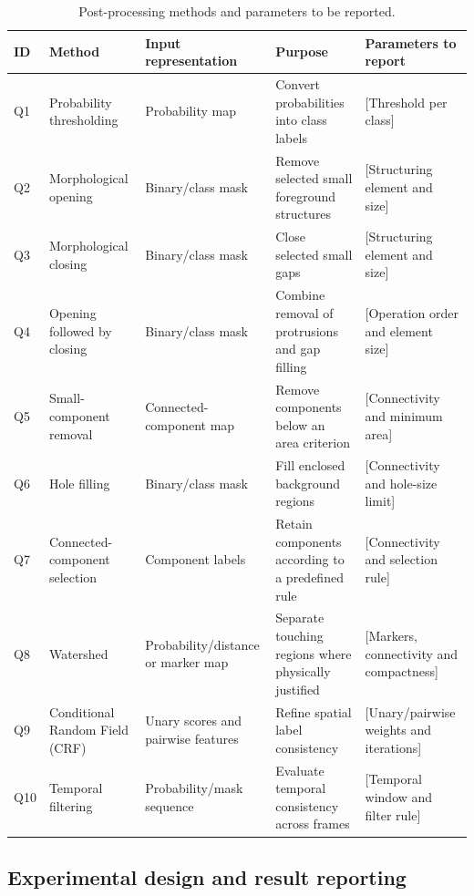 \documentclass[final,5p,times,twocolumn]{elsarticle}
\begin{document}
\begin{table}[t]
    \centering
    \caption{Post-processing methods and parameters to be reported.}
    \label{tab:postprocessing}
    \small
    \begin{tabularx}{\textwidth}{L{0.65cm} L{3.0cm} L{2.5cm} Y Y}
        \toprule
        \textbf{ID} & \textbf{Method} & \textbf{Input representation} &
        \textbf{Purpose} & \textbf{Parameters to report} \\
        \midrule
        Q1 & Probability thresholding & Probability map &
        Convert probabilities into class labels & [Threshold per class] \\
        Q2 & Morphological opening & Binary/class mask &
        Remove selected small foreground structures & [Structuring element and size] \\
        Q3 & Morphological closing & Binary/class mask &
        Close selected small gaps & [Structuring element and size] \\
        Q4 & Opening followed by closing & Binary/class mask &
        Combine removal of protrusions and gap filling & [Operation order and element size] \\
        Q5 & Small-component removal & Connected-component map &
        Remove components below an area criterion & [Connectivity and minimum area] \\
        Q6 & Hole filling & Binary/class mask &
        Fill enclosed background regions & [Connectivity and hole-size limit] \\
        Q7 & Connected-component selection & Component labels &
        Retain components according to a predefined rule & [Connectivity and selection rule] \\
        Q8 & Watershed & Probability/distance or marker map &
        Separate touching regions where physically justified & [Markers, connectivity and compactness] \\
        Q9 & Conditional Random Field (CRF) & Unary scores and pairwise features &
        Refine spatial label consistency & [Unary/pairwise weights and iterations] \\
        Q10 & Temporal filtering & Probability/mask sequence &
        Evaluate temporal consistency across frames & [Temporal window and filter rule] \\
        \bottomrule
    \end{tabularx}
\end{table}

\subsection{Experimental design and result reporting}
\label{subsec:experimental_design}
\end{document}
